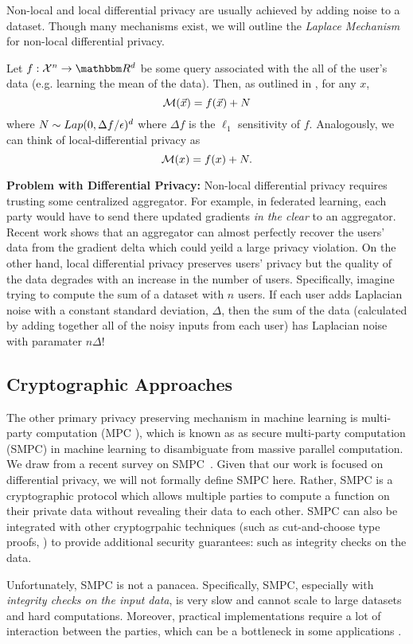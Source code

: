 \documentclass[11pt]{article}
\begin{document}
Non-local and local differential privacy are usually achieved by adding noise to a dataset.
Though many mechanisms exist, we will outline the \emph{Laplace Mechanism} for non-local differential privacy.

Let $f: \mathcal{X}^n \rightarrow \R^d$ be some query associated with the all of the user's data (e.g. learning the mean of the data).
Then, as outlined in \cite{Bassily_2015}, for any $x$,
\[
	\mathcal{M}(\vec{x}) = f(\vec{x}) + N
\]
where $N \sim Lap(0, \Delta f/ \epsilon)^{d}$ where $\Delta f$ is the $\ell_1$ sensitivity of $f$.
Analogously, we can think of local-differential privacy as \[
	\mathcal{M}(x) = f(x) + N.
\]

\textbf{Problem with Differential Privacy:} Non-local differential privacy requires trusting some centralized aggregator.
For example, in federated learning, each party would have to send there updated gradients \emph{in the clear} to an aggregator.
Recent work  shows that an aggregator can almost perfectly recover the users' data from the gradient delta which could yeild a large privacy violation.
On the other hand, local differential privacy preserves users' privacy but the quality of the data degrades with an increase in the number of users.
Specifically, imagine trying to compute the sum of a dataset with $n$ users.
If each user adds Laplacian noise with a constant standard deviation, $\Delta$, then the sum of the data (calculated by adding together all of the noisy inputs from each user) has Laplacian noise with paramater $n \Delta$!

\subsection{Cryptographic Approaches}
The other primary privacy preserving mechanism in machine learning is multi-party computation (MPC ), which is known as as secure multi-party computation (SMPC) in machine learning to disambiguate from massive parallel computation.
We draw from a recent survey on SMPC~\cite{zhou2024secure}.
Given that our work is focused on differential privacy, we will not formally define SMPC here.
Rather, SMPC is a cryptographic protocol which allows multiple parties to compute a function on their private data without revealing their data to each other.
SMPC can also be integrated with other cryptogrpahic techniques (such as cut-and-choose type proofs, ) to provide additional security guarantees: such as integrity checks on the data.

Unfortunately, SMPC is not a panacea.
Specifically, SMPC, especially with \emph{integrity checks on the input data}, is very slow and cannot scale to large datasets and hard computations.
Moreover, practical implementations require a lot of interaction between the parties, which can be a bottleneck in some applications \cite{zhao2019secure}.
\end{document}
